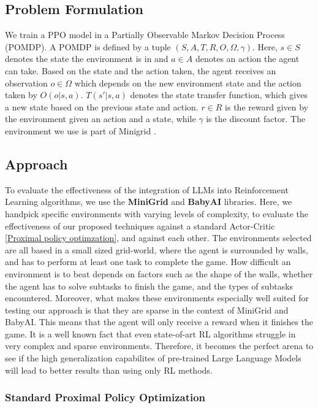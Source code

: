 \documentclass[conference]{IEEEtran}
\begin{document}
\subsection{Problem Formulation}

We train a PPO model in a Partially Observable Markov Decision Process (POMDP). A POMDP is defined by a tuple $(S, A, T, R, O, \Omega, \gamma)$. Here, $s \in S$ denotes the state the environment is in and $a \in A$ denotes an action the agent can take. Based on the state and the action taken, the agent receives an observation $o \in \Omega$ which depends on the new environment state and the action taken by $O(o | s, a)$. $T(s' | s, a)$ denotes the state transfer function, which gives a new state based on the previous state and action. $r \in R$ is the reward given by the environment given an action and a state, while $\gamma$ is the discount factor.  The environment we use is part of Minigrid \cite{minigrid}. 

\subsection{Approach}

To evaluate the effectiveness of the integration of LLMs into Reinforcement Learning algorithms, we use the \textbf{MiniGrid} and \textbf{BabyAI} libraries. Here, we handpick specific environments with varying levels of complexity, to evaluate the effectiveness of our proposed techniques against a standard Actor-Critic \ref{Proximal policy optimzation}, and against each other. The environments selected are all based in a small sized grid-world, where the agent is surrounded by walls, and has to perform at least one task to complete the game. How difficult an environment is to beat depends on factors such as the shape of the walls, whether the agent has to solve subtasks to finish the game, and the types of subtasks encountered. Moreover, what makes these environments especially well suited for testing our approach is that they are sparse in the context of MiniGrid and BabyAI. This means that the agent will only receive a reward when it finishes the game. It is a well known fact that even state-of-art RL algorithms struggle in very complex and sparse environments. Therefore, it becomes the perfect arena to see if the high generalization capabilites of pre-trained Large Language Models will lead to better results than using only RL methods.


\subsubsection{Standard Proximal Policy Optimization}
\end{document}
